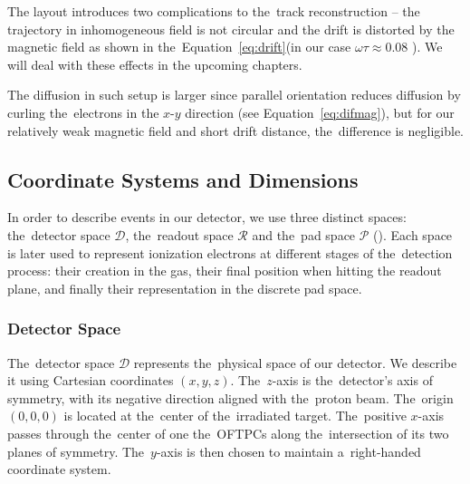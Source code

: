 			The layout introduces two complications to the~track reconstruction -- the trajectory in inhomogeneous field is not circular and the drift is distorted by the magnetic field as shown in the~Equation~\ref{eq:drift}(in our case $\omega\tau \approx 0.08$ ). We will deal with these effects in the upcoming chapters.
			
			The diffusion in such setup is larger since parallel orientation reduces diffusion by curling the~electrons in the $x$\nobreakdash-$y$ direction (see Equation~\ref{eq:difmag}), but for our relatively weak magnetic field and short drift distance, the~difference is negligible.
	
		\subsection{Coordinate Systems and Dimensions}
		\label{sec:coor}
			In order to describe events in our detector, we use three distinct spaces: the~detector space $\mathcal{D}$, the~readout space $\mathcal{R}$ and the~pad space $\mathcal{P}$ (). Each space is later used to represent ionization electrons at different stages of the~detection process: their creation in the gas, their final position when hitting the readout plane, and finally their representation in the discrete pad space.
		
			\subsubsection{Detector Space}
				The~detector space $\mathcal{D}$ represents the~physical space of our detector. We describe it using Cartesian coordinates $(x,y,z)$. The~$z$-axis is the~detector's axis of symmetry, with its negative direction aligned with the~proton beam. The~origin $(0,0,0)$ is located at the~center of the~irradiated target. The~positive $x$\nobreakdash-axis passes through the~center of one the~\ac{OFTPC}s along the~intersection of its two planes of symmetry. The~$y$\nobreakdash-axis is then chosen to maintain a~right-handed coordinate system.
				
